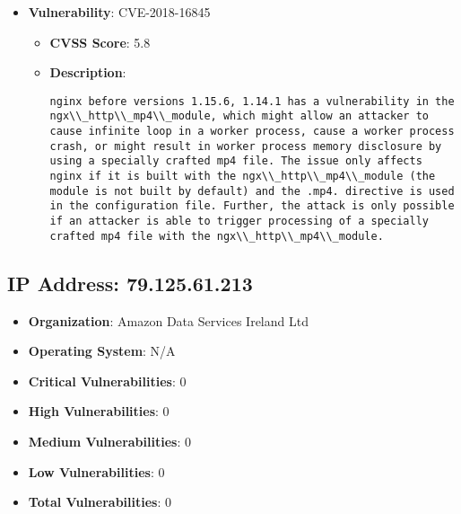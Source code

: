 \documentclass{article}
\begin{document}
\begin{itemize}
        \item \textbf{Vulnerability}: CVE-2018-16845
        \begin{itemize}
            \item \textbf{CVSS Score}:  5.8 
            \item \textbf{Description}:
            \parbox[t]{0.9\linewidth}{
                \verb|nginx before versions 1.15.6, 1.14.1 has a vulnerability in the ngx\\_http\\_mp4\\_module, which might allow an attacker to cause infinite loop in a worker process, cause a worker process crash, or might result in worker process memory disclosure by using a specially crafted mp4 file. The issue only affects nginx if it is built with the ngx\\_http\\_mp4\\_module (the module is not built by default) and the .mp4. directive is used in the configuration file. Further, the attack is only possible if an attacker is able to trigger processing of a specially crafted mp4 file with the ngx\\_http\\_mp4\\_module.|
            }
        \end{itemize}
    
\end{itemize}




\clearpage



\subsection*{IP Address: 79.125.61.213}

\begin{itemize}
    \item \textbf{Organization}: Amazon Data Services Ireland Ltd
    \item \textbf{Operating System}:  N/A 
    \item \textbf{Critical Vulnerabilities}: 0
    \item \textbf{High Vulnerabilities}: 0
    \item \textbf{Medium Vulnerabilities}: 0
    \item \textbf{Low Vulnerabilities}: 0
    \item \textbf{Total Vulnerabilities}: 0
\end{itemize}
\end{document}
